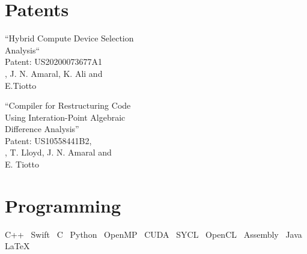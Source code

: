 \documentclass[]{twocol-resume}
\begin{document}
\begin{minipage}[t]{0.33\textwidth}
\section{Patents}
\vspace{\topsep} %
\begin{tightemize}
\item ``Hybrid Compute Device Selection
     \\\hspace{-3mm}Analysis``
     \\\hspace{-3mm}Patent: US20200073677A1
     \\\hspace{-3mm}, J. N. Amaral, K. Ali and\\\hspace{-3mm}E.Tiotto
\item ``Compiler for Restructuring Code\\\hspace{-3mm}Using Interation-Point Algebraic\\\hspace{-3mm}Difference
     Analysis''
     \\\hspace{-3mm}Patent: US10558441B2,
     \\\hspace{-3mm}, T. Lloyd, J. N. Amaral and\\\hspace{-3mm}E. Tiotto
\end{tightemize}
\vspace*{-3mm}
\sectionsepsmall

\section{Programming}
\mbox{C++ \textbullet{}} \mbox{Swift \textbullet{}} \mbox{C \textbullet{}}
\mbox{Python \textbullet} \mbox{OpenMP \textbullet{}}
\mbox{CUDA \textbullet{}} \mbox{SYCL \textbullet{}} \mbox{OpenCL \textbullet{}}
\mbox{Assembly \textbullet{}} \mbox{Java \textbullet{}}
\mbox{\LaTeX}\\
\vspace*{-3mm}
\sectionsepsmall

%
%
\end{minipage}
\end{document}
